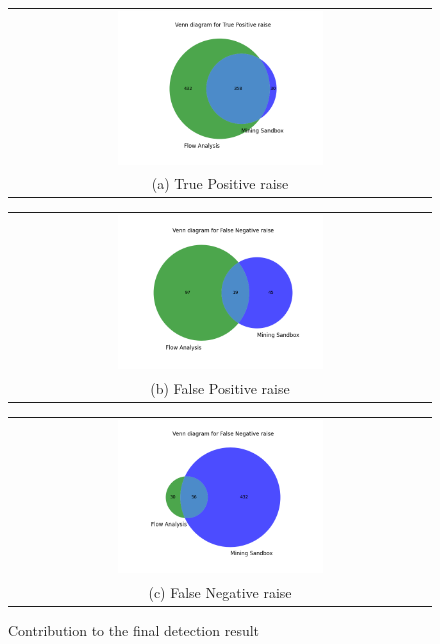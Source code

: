 \begin{figure}[h]
  \centering
  \begin{tabular}{@{}c@{}}
    \includegraphics[width=0.5\textwidth]{image/vennTP.png} \\[\abovecaptionskip]
    \small (a) True Positive raise
  \end{tabular}

  \begin{tabular}{@{}c@{}}
    \includegraphics[width=0.5\textwidth]{image/vennFP.png} \\[\abovecaptionskip]
    \small (b) False Positive raise
  \end{tabular}
   \begin{tabular}{@{}c@{}}
    \includegraphics[width=0.5\textwidth]{image/vennFN.png} \\[\abovecaptionskip]
    \small (c) False Negative raise
  \end{tabular}

  \caption{Contribution to the final detection result}\label{fig:venn}
\end{figure}





